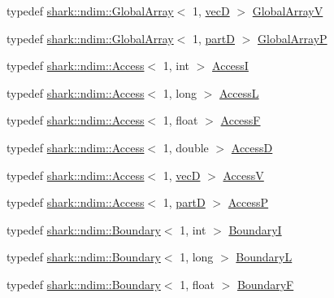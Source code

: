 \begin{DoxyCompactItemize}
\item 
typedef \hyperlink{classshark_1_1ndim_1_1_global_array}{shark\+::ndim\+::\+Global\+Array}$<$ 1, \hyperlink{namespaceshark_1_1types1d_a96b222de82755e7cdf915ca4652abb00}{vecD} $>$ \hyperlink{namespaceshark_1_1types1d_af18105ae16d2dd8b62620f8ee6328bc1}{Global\+ArrayV}
\item 
typedef \hyperlink{classshark_1_1ndim_1_1_global_array}{shark\+::ndim\+::\+Global\+Array}$<$ 1, \hyperlink{namespaceshark_1_1types1d_a46775e0f758bf283c37ef3733ac9e294}{partD} $>$ \hyperlink{namespaceshark_1_1types1d_aae323368f0f77f7f1d118a70156cf8f4}{Global\+ArrayP}
\item 
typedef \hyperlink{classshark_1_1ndim_1_1_access}{shark\+::ndim\+::\+Access}$<$ 1, int $>$ \hyperlink{namespaceshark_1_1types1d_a3e0ba1df1379dee1262f190172c0a19f}{AccessI}
\item 
typedef \hyperlink{classshark_1_1ndim_1_1_access}{shark\+::ndim\+::\+Access}$<$ 1, long $>$ \hyperlink{namespaceshark_1_1types1d_af8a71c7ea6e215e49744784528a63d1e}{AccessL}
\item 
typedef \hyperlink{classshark_1_1ndim_1_1_access}{shark\+::ndim\+::\+Access}$<$ 1, float $>$ \hyperlink{namespaceshark_1_1types1d_ab69cddb6d83ab9c0e5abe54e7bd70425}{AccessF}
\item 
typedef \hyperlink{classshark_1_1ndim_1_1_access}{shark\+::ndim\+::\+Access}$<$ 1, double $>$ \hyperlink{namespaceshark_1_1types1d_ae9bc6d1785fb19540415dea9aad1e1bd}{AccessD}
\item 
typedef \hyperlink{classshark_1_1ndim_1_1_access}{shark\+::ndim\+::\+Access}$<$ 1, \hyperlink{namespaceshark_1_1types1d_a96b222de82755e7cdf915ca4652abb00}{vecD} $>$ \hyperlink{namespaceshark_1_1types1d_a2469604c6867c0615237809c14396e97}{AccessV}
\item 
typedef \hyperlink{classshark_1_1ndim_1_1_access}{shark\+::ndim\+::\+Access}$<$ 1, \hyperlink{namespaceshark_1_1types1d_a46775e0f758bf283c37ef3733ac9e294}{partD} $>$ \hyperlink{namespaceshark_1_1types1d_a22b84fc439e41258b86b79db74f90fd1}{AccessP}
\item 
typedef \hyperlink{classshark_1_1ndim_1_1_boundary}{shark\+::ndim\+::\+Boundary}$<$ 1, int $>$ \hyperlink{namespaceshark_1_1types1d_a2d68c8b34e33ecf5d76eb6b631588b7c}{BoundaryI}
\item 
typedef \hyperlink{classshark_1_1ndim_1_1_boundary}{shark\+::ndim\+::\+Boundary}$<$ 1, long $>$ \hyperlink{namespaceshark_1_1types1d_a1a32b7a698d4ba32c285ab84f5ad9c0e}{BoundaryL}
\item 
typedef \hyperlink{classshark_1_1ndim_1_1_boundary}{shark\+::ndim\+::\+Boundary}$<$ 1, float $>$ \hyperlink{namespaceshark_1_1types1d_af5648fa4f31ae57e91d3b749136deb48}{BoundaryF}

\end{DoxyCompactItemize}
